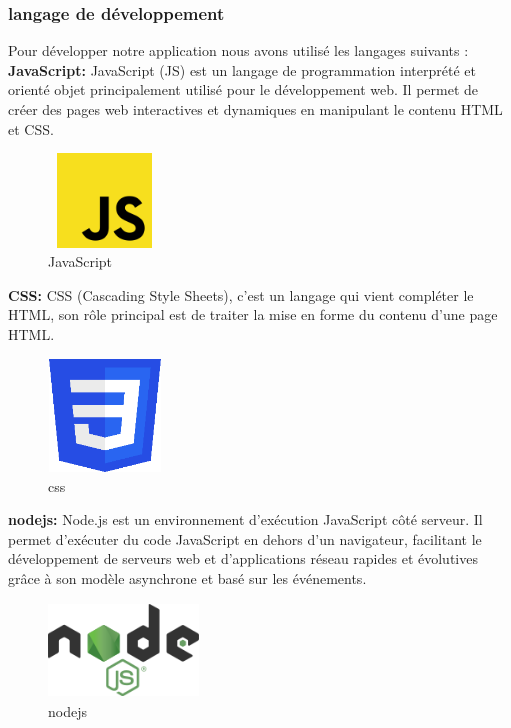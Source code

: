 \documentclass[edit,12pt,a4paper,ChapStyle,oneside,doubleinterligne]{report}
\begin{document}
\subsubsection{langage de développement }
Pour développer notre application nous avons utilisé les langages suivants :
\newline\textbf{JavaScript: }JavaScript (JS) est un langage de programmation interprété et orienté objet principalement utilisé pour le développement web. Il permet de créer des pages web interactives et dynamiques en manipulant le contenu HTML et CSS\cite{js}.
\begin{figure}[H]\label{fig:js}
    \centering
    \includegraphics[width=3cm , height = 2.5cm , angle=360]{images/Javascript.png}
    \caption{JavaScript}
    \end{figure}
\textbf{CSS: }CSS (Cascading Style Sheets), c’est un langage qui vient compléter le HTML, son rôle principal est de traiter la mise en forme du contenu d’une page HTML\cite{css}.
\begin{figure}[H]\label{fig:css}
    \centering
    \includegraphics[width=3cm , height = 3cm , angle=360]{images/css.png}
    \caption{css}
    \end{figure}
\newpage
\textbf{nodejs: }Node.js est un environnement d'exécution JavaScript côté serveur. Il permet d'exécuter du code JavaScript en dehors d'un navigateur, facilitant le développement de serveurs web et d'applications réseau rapides et évolutives grâce à son modèle asynchrone et basé sur les événements\cite{nodejs}.
\begin{figure}[H]\label{fig:nodejs}
    \centering
    \includegraphics[width=4cm , height = 2.5cm , angle=360]{images/nodejs.png}
    \caption{nodejs}
    \end{figure}
\end{document}

